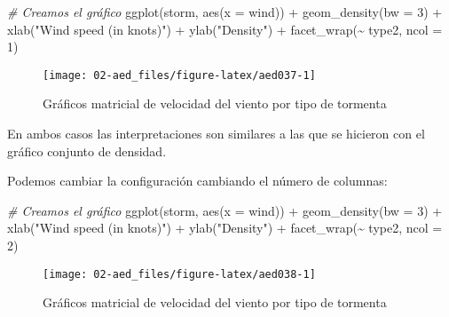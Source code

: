 \documentclass[
]{book}
\newenvironment{Shaded}{\begin{snugshade}}{\end{snugshade}}
\newcommand{\AttributeTok}[1]{\textcolor[rgb]{0.77,0.63,0.00}{#1}}
\newcommand{\CommentTok}[1]{\textcolor[rgb]{0.56,0.35,0.01}{\textit{#1}}}
\newcommand{\DecValTok}[1]{\textcolor[rgb]{0.00,0.00,0.81}{#1}}
\newcommand{\FunctionTok}[1]{\textcolor[rgb]{0.00,0.00,0.00}{#1}}
\newcommand{\NormalTok}[1]{#1}
\newcommand{\SpecialCharTok}[1]{\textcolor[rgb]{0.00,0.00,0.00}{#1}}
\newcommand{\StringTok}[1]{\textcolor[rgb]{0.31,0.60,0.02}{#1}}
\begin{document}
\begin{Shaded}
\begin{Highlighting}[]
\CommentTok{\# Creamos el gráfico}
\FunctionTok{ggplot}\NormalTok{(storm, }\FunctionTok{aes}\NormalTok{(}\AttributeTok{x =}\NormalTok{ wind))  }\SpecialCharTok{+}
  \FunctionTok{geom\_density}\NormalTok{(}\AttributeTok{bw =} \DecValTok{3}\NormalTok{) }\SpecialCharTok{+} 
  \FunctionTok{xlab}\NormalTok{(}\StringTok{"Wind speed (in knots)"}\NormalTok{) }\SpecialCharTok{+}
  \FunctionTok{ylab}\NormalTok{(}\StringTok{"Density"}\NormalTok{) }\SpecialCharTok{+}
  \FunctionTok{facet\_wrap}\NormalTok{(}\SpecialCharTok{\textasciitilde{}}\NormalTok{ type2, }\AttributeTok{ncol =} \DecValTok{1}\NormalTok{)}
\end{Highlighting}
\end{Shaded}

\begin{figure}

{\centering \texttt{[image: 02-aed\_files/figure-latex/aed037-1]} 

}

\caption{Gráficos matricial de velocidad del viento por tipo de tormenta}\label{fig:aed037}
\end{figure}

En ambos casos las interpretaciones son similares a las que se hicieron con el gráfico conjunto de densidad.

Podemos cambiar la configuración cambiando el número de columnas:

\begin{Shaded}
\begin{Highlighting}[]
\CommentTok{\# Creamos el gráfico}
\FunctionTok{ggplot}\NormalTok{(storm, }\FunctionTok{aes}\NormalTok{(}\AttributeTok{x =}\NormalTok{ wind))  }\SpecialCharTok{+}
  \FunctionTok{geom\_density}\NormalTok{(}\AttributeTok{bw =} \DecValTok{3}\NormalTok{) }\SpecialCharTok{+} 
  \FunctionTok{xlab}\NormalTok{(}\StringTok{"Wind speed (in knots)"}\NormalTok{) }\SpecialCharTok{+}
  \FunctionTok{ylab}\NormalTok{(}\StringTok{"Density"}\NormalTok{) }\SpecialCharTok{+}
  \FunctionTok{facet\_wrap}\NormalTok{(}\SpecialCharTok{\textasciitilde{}}\NormalTok{ type2, }\AttributeTok{ncol =} \DecValTok{2}\NormalTok{)}
\end{Highlighting}
\end{Shaded}

\begin{figure}

{\centering \texttt{[image: 02-aed\_files/figure-latex/aed038-1]} 

}

\caption{Gráficos matricial de velocidad del viento por tipo de tormenta}\label{fig:aed038}
\end{figure}
\end{document}
